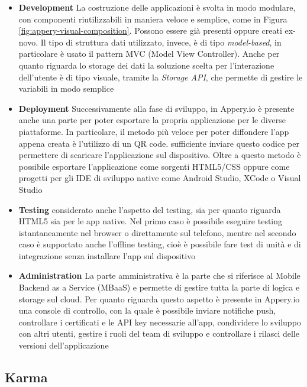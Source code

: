 \begin{itemize}
	\item \textbf{Development}
	La costruzione delle applicazioni è svolta in modo modulare, con componenti riutilizzabili in maniera veloce e semplice, come in Figura \ref{fig:appery-visual-composition}. Possono essere già presenti oppure creati ex-novo. Il tipo di struttura dati utilizzato, invece, è di tipo \emph{model-based}, in particolare è usato il pattern MVC (Model View Controller). Anche per quanto riguarda lo storage dei dati la soluzione scelta per l'interazione dell'utente è di tipo visuale, tramite la \emph{Storage API}, che permette di gestire le variabili in modo semplice
	\item \textbf{Deployment}
	Successivamente alla fase di sviluppo, in Appery.io è presente anche una parte per poter esportare la propria applicazione per le diverse piattaforme. In particolare, il metodo più veloce per poter diffondere l'app appena creata è l'utilizzo di un QR code. \upe sufficiente inviare questo codice per permettere di scaricare l'applicazione sul dispositivo. Oltre a questo metodo è possibile esportare l'applicazione come sorgenti HTML5/CSS oppure come progetti per gli IDE di sviluppo native come Android Studio, XCode o Visual Studio
	\item \textbf{Testing}
	\upe considerato anche l'aspetto del testing, sia per quanto riguarda HTML5 sia per  le app native.
	Nel primo caso è possibile eseguire testing istantaneamente nel browser o direttamente sul telefono, mentre nel secondo caso è supportato anche l'offline testing, cioè è possibile fare test di unità e di integrazione senza installare l'app sul dispositivo
	\item \textbf{Administration}
	La parte amministrativa è la parte che si riferisce al Mobile Backend as a Service (MBaaS) e permette di gestire tutta la parte di logica e storage sul cloud. Per quanto riguarda questo aspetto è presente in Appery.io una console di controllo, con la quale è possibile inviare notifiche push, controllare i certificati e le API key necessarie all'app, condividere lo sviluppo con altri utenti, gestire i ruoli del team di sviluppo e controllare i rilasci delle versioni dell'applicazione
\end{itemize}

\subsection*{Karma}

